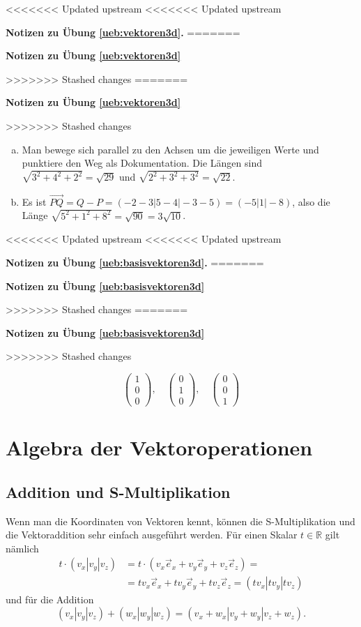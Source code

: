 \documentclass[%
11pt,%
twoside,%
titlepage,%
<<<<<<< Updated upstream
<<<<<<< Updated upstream
german,%
=======
swissgerman,%
>>>>>>> Stashed changes
=======
swissgerman,%
>>>>>>> Stashed changes
headsepline%
]{scrartcl}
\newcommand{\faReturnGray}{\textcolor{gray}{\faMailReply}} %
\newcommand{\faReturnGray}{\textcolor{gray}{\faMailReply}} %
\theoremstyle{definition}
\theoremstyle{plain}
\newcommand{\concatueb}[1]{ueb:#1}%
\newcommand{\concatlsg}[1]{lsg:#1}%
\newenvironment{lsg}[1]{%
<<<<<<< Updated upstream
<<<<<<< Updated upstream
    \par\noindent\textbf{Notizen zu Übung \ref{\concatueb{#1}}.}%
    \label{\concatlsg{#1}}
=======
    \par\noindent\textbf{Notizen zu Übung \ref{\concatueb{#1}}}\label{\concatlsg{#1}}
    \hfill\hyperref[\concatueb{#1}]{\faReturnGray}\par %
>>>>>>> Stashed changes
=======
    \par\noindent\textbf{Notizen zu Übung \ref{\concatueb{#1}}}\label{\concatlsg{#1}}
    \hfill\hyperref[\concatueb{#1}]{\faReturnGray}\par %
>>>>>>> Stashed changes
}{%
    \par%
}
\begin{document}
\begin{lsg}{vektoren3d}
    \begin{enumerate}[a)]
        \item Man bewege sich parallel zu den Achsen um die jeweiligen Werte und punktiere den Weg als Dokumentation. Die Längen sind $\sqrt{3^2+4^2+2^2}=\sqrt{29}$ und $\sqrt{2^2+3^2+3^2}=\sqrt{22}$.
        \item Es ist $\vec{PQ}=Q-P=(-2-3|5-4|-3-5)=(-5|1|-8)$, also die Länge $\sqrt{5^2+1^2+8^2}=\sqrt{90}=3\sqrt{10}$.
    \end{enumerate}
\end{lsg}
\begin{lsg}{basisvektoren3d}
    $$\begin{pmatrix}
        1\\0\\0
    \end{pmatrix},\quad\begin{pmatrix}
        0\\1\\0
    \end{pmatrix},\quad\begin{pmatrix}
        0\\0\\1
    \end{pmatrix}$$
\end{lsg}

\clearpage

\section{Algebra der Vektoroperationen}

\subsection{Addition und S-Multiplikation}

Wenn man die Koordinaten von Vektoren kennt, können die S-Multiplikation und die Vektoraddition sehr einfach ausgeführt werden. Für
einen Skalar $t\in\mathbb{R}$ gilt nämlich
\begin{align*}
t\cdot(v_x|v_y|v_z)&=t\cdot(v_x\vec{e}_x+v_y\vec{e}_y+v_z\vec{e}_z)=\\
&=tv_x\vec{e}_x+tv_y\vec{e}_y+tv_z\vec{e}_z=(tv_x|tv_y|tv_z)
\end{align*}
und für die Addition
$$(v_x|v_y|v_z)+(w_x|w_y|w_z)=(v_x+w_x|v_y+w_y|v_z+w_z).$$
\end{document}
